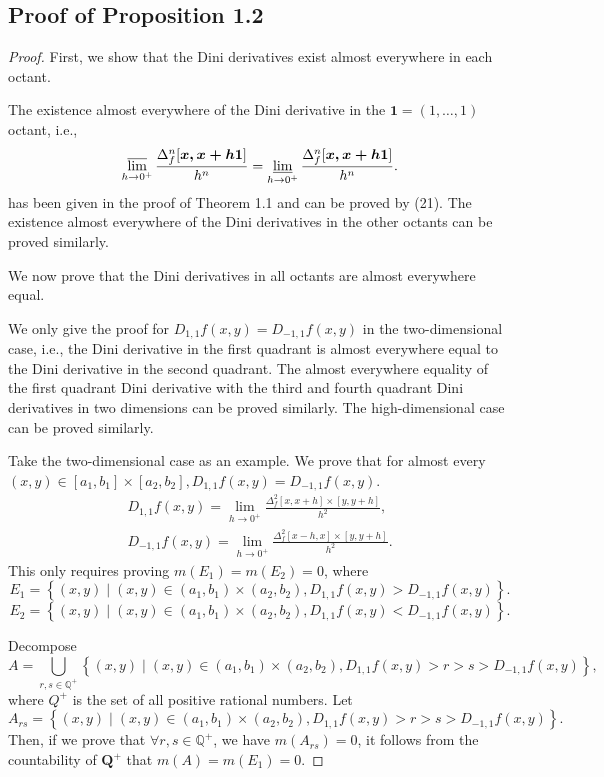 \documentclass{ijclclp}
\begin{document}
\subsection{Proof of Proposition 1.2}
\begin{proof}
    First, we show that the Dini derivatives exist almost everywhere in each octant.
    
    The existence almost everywhere of the Dini derivative in the \(\boldsymbol{1}=(1,\dots,1)\) octant, i.e.,
    \[\varlimsup_{h\to0^+}\frac{\Delta_f^n[\boldsymbol{x,\boldsymbol{x}+h\boldsymbol{1}}]}{h^n}=\varliminf_{h\to0^+}\frac{\Delta_f^n[\boldsymbol{x,\boldsymbol{x}+h\boldsymbol{1}}]}{h^n}.\]
    has been given in the proof of Theorem 1.1 and can be proved by (21). The existence almost everywhere of the Dini derivatives in the other octants can be proved similarly.

    We now prove that the Dini derivatives in all octants are almost everywhere equal.

    We only give the proof for \(D_{1,1}f(x,y)=D_{-1,1}f(x,y)\) in the two-dimensional case, i.e., the Dini derivative in the first quadrant is almost everywhere equal to the Dini derivative in the second quadrant. The almost everywhere equality of the first quadrant Dini derivative with the third and fourth quadrant Dini derivatives in two dimensions can be proved similarly. The high-dimensional case can be proved similarly.

    Take the two-dimensional case as an example. We prove that for almost every \((x,y)\in[a_1,b_1]\times[a_2,b_2],D_{1,1}f(x,y)=D_{-1,1}f(x,y)\).
    \begin{align*}
        D_{1,1}f(x,y)=\lim_{h\to0^{+}}\frac{\Delta_f^2[x,x+h]\times[y,y+h]}{h^2},\\
        D_{-1,1}f(x,y)=\lim_{h\to0^{+}}\frac{\Delta_f^2[x-h,x]\times[y,y+h]}{h^2}.
    \end{align*}
    This only requires proving \(m(E_1)=m(E_2)=0\), where
    \[E_1=\left\{(x,y)\mid(x,y)\in(a_1,b_1)\times(a_2,b_2), D_{1,1}f(x,y)>D_{-1,1}f(x,y)\right\}.\]
    \[E_2=\left\{(x,y)\mid(x,y)\in(a_1,b_1)\times(a_2,b_2), D_{1,1}f(x,y)<D_{-1,1}f(x,y)\right\}.\]
    
    Decompose
    \[A=\bigcup_{r,s\in\mathbb{Q}^{+}}\left\{(x,y)\mid (x,y)\in(a_1,b_1)\times(a_2,b_2),D_{1,1}f(x,y)>r>s>D_{-1,1}f(x,y)\right\},\]
    where \(Q^+\) is the set of all positive rational numbers. Let
    \[A_{rs}=\left\{(x,y)\mid (x,y)\in(a_1,b_1)\times(a_2,b_2),D_{1,1}f(x,y)>r>s>D_{-1,1}f(x,y)\right\}.\]
    Then, if we prove that  \(\forall r,s\in\mathbb{Q}^{+}\), we have \(m(A_{rs})=0\), it follows from the countability of \(\mathbf{Q}^{+}\) that \(m(A)=m(E_1)=0\).
    

\end{proof}
\end{document}
